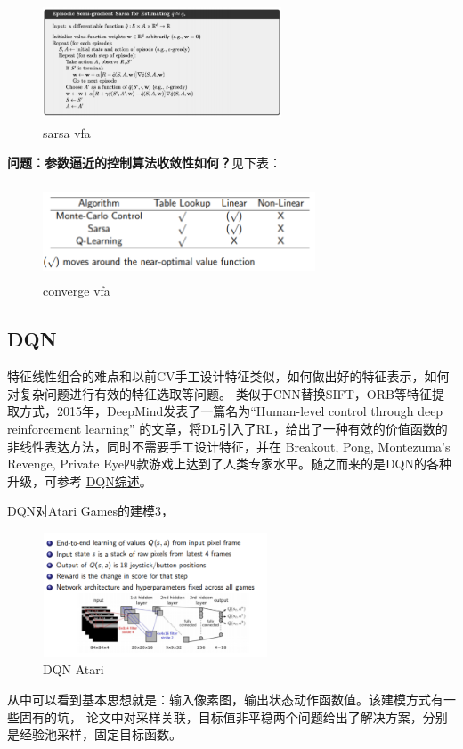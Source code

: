 \documentclass[UTF8]{ctexart}
\begin{document}
\begin{figure}[htbp]
	\centering
	\includegraphics[width=7.1cm, height=3.5cm]{./pic/sarsa_vfa.png}
    \caption{sarsa vfa}
    \label{sarsa:vfa}
\end{figure}

\textbf{问题：参数逼近的控制算法收敛性如何？}见下表：

\begin{figure}[htbp]
	\centering
	\includegraphics[width=8.1cm, height=2.8cm]{./pic/converge_vfa.png}
    \caption{converge vfa}
    \label{converge:vfa}
\end{figure}


\subsection{DQN}
特征线性组合的难点和以前CV手工设计特征类似，如何做出好的特征表示，如何对复杂问题进行有效的特征选取等问题。
类似于CNN替换SIFT，ORB等特征提取方式，2015年，DeepMind发表了一篇名为“Human-level control through deep reinforcement learning”
的文章，将DL引入了RL，给出了一种有效的价值函数的非线性表达方法，同时不需要手工设计特征，并在
Breakout, Pong, Montezuma’s Revenge, Private Eye四款游戏上达到了人类专家水平。随之而来的是DQN的各种升级，可参考
\href{https://deepmind.com/blog/article/Agent57-Outperforming-the-human-Atari-benchmark}{DQN综述}。

DQN对Atari Games的建模\ref{DQN:Atari}，
\begin{figure}[htbp]
	\centering
	\includegraphics[width=6.7cm, height=3.7cm]{./pic/DQN_Atari.png}
    \caption{DQN Atari}
    \label{DQN:Atari}
\end{figure}
从中可以看到基本思想就是：输入像素图，输出状态动作函数值。该建模方式有一些固有的坑，
论文中对采样关联，目标值非平稳两个问题给出了解决方案，分别是经验池采样，固定目标函数。
\end{document}
